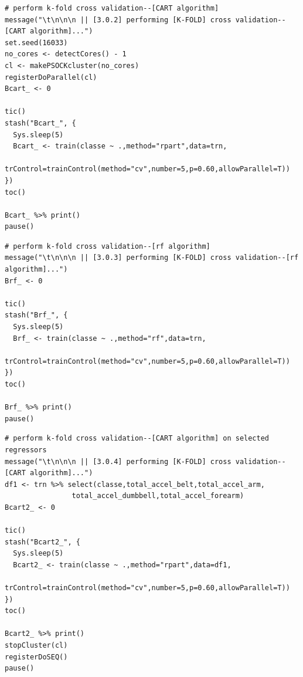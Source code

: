 \documentclass[10pt, twoside]{article}
\begin{document}
\begin{verbatim}
# perform k-fold cross validation--[CART algorithm]
message("\t\n\n\n || [3.0.2] performing [K-FOLD] cross validation--[CART algorithm]...")
set.seed(16033)
no_cores <- detectCores() - 1
cl <- makePSOCKcluster(no_cores)
registerDoParallel(cl)
Bcart_ <- 0

tic()
stash("Bcart_", {
  Sys.sleep(5)
  Bcart_ <- train(classe ~ .,method="rpart",data=trn,
      trControl=trainControl(method="cv",number=5,p=0.60,allowParallel=T))
})
toc()

Bcart_ %>% print()
pause()
\end{verbatim}

\begin{verbatim}
# perform k-fold cross validation--[rf algorithm]
message("\t\n\n\n || [3.0.3] performing [K-FOLD] cross validation--[rf algorithm]...")
Brf_ <- 0

tic()
stash("Brf_", {
  Sys.sleep(5)
  Brf_ <- train(classe ~ .,method="rf",data=trn,
          trControl=trainControl(method="cv",number=5,p=0.60,allowParallel=T))
})
toc()

Brf_ %>% print()
pause()
\end{verbatim}

\begin{verbatim}
# perform k-fold cross validation--[CART algorithm] on selected regressors
message("\t\n\n\n || [3.0.4] performing [K-FOLD] cross validation--[CART algorithm]...")
df1 <- trn %>% select(classe,total_accel_belt,total_accel_arm,
                total_accel_dumbbell,total_accel_forearm)
Bcart2_ <- 0

tic()
stash("Bcart2_", {
  Sys.sleep(5)
  Bcart2_ <- train(classe ~ .,method="rpart",data=df1,
       trControl=trainControl(method="cv",number=5,p=0.60,allowParallel=T))
})
toc()

Bcart2_ %>% print()
stopCluster(cl)
registerDoSEQ()
pause()
\end{verbatim}
\end{document}

